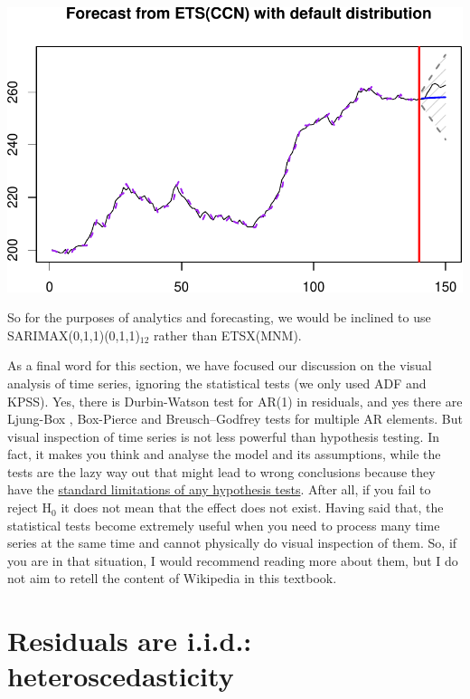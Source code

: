 \documentclass[
]{book}
\theoremstyle{definition}
\theoremstyle{definition}
\theoremstyle{definition}
\theoremstyle{definition}
\theoremstyle{remark}
\begin{document}
\includegraphics{adam_files/figure-latex/unnamed-chunk-154-1.pdf}

So for the purposes of analytics and forecasting, we would be inclined to use SARIMAX(0,1,1)(0,1,1)\(_{12}\) rather than ETSX(MNM).

As a final word for this section, we have focused our discussion on the visual analysis of time series, ignoring the statistical tests (we only used ADF and KPSS). Yes, there is Durbin-Watson \citep{WikipediaDurbinWatson2021} test for AR(1) in residuals, and yes there are Ljung-Box \citep{WikipediaLjungBox2021}, Box-Pierce and Breusch--Godfrey \citep{WikipediaBreuschGodfrey2021} tests for multiple AR elements. But visual inspection of time series is not less powerful than hypothesis testing. In fact, it makes you think and analyse the model and its assumptions, while the tests are the lazy way out that might lead to wrong conclusions because they have the \protect\hyperlink{hypothesisTesting}{standard limitations of any hypothesis tests}. After all, if you fail to reject H\(_0\) it does not mean that the effect does not exist. Having said that, the statistical tests become extremely useful when you need to process many time series at the same time and cannot physically do visual inspection of them. So, if you are in that situation, I would recommend reading more about them, but I do not aim to retell the content of Wikipedia in this textbook.

\hypertarget{diagnosticsResidualsIIDHetero}{%
\section{Residuals are i.i.d.: heteroscedasticity}\label{diagnosticsResidualsIIDHetero}}
\end{document}
